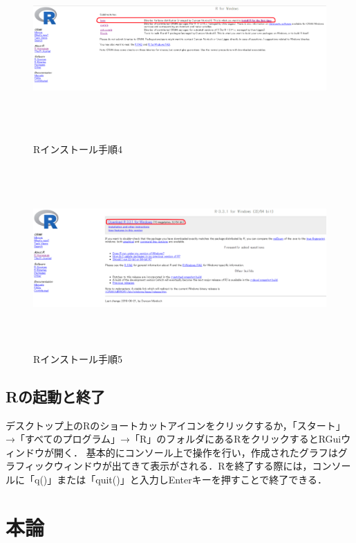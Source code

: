 \begin{figure}[p]
\centering
\includegraphics[height=7cm,width=13cm]{R25.pdf}
\caption{Rインストール手順4}\label{サンプル図}
\end{figure}



\begin{figure}[p]
\centering
\includegraphics[height=7cm,width=13cm]{R3.pdf}
\caption{Rインストール手順5}\label{サンプル図}
\end{figure}


\newpage

\section{Rの起動と終了}
デスクトップ上のRのショートカットアイコンをクリックするか，「スタート」→「すべてのプログラム」→「R」のフォルダにあるRをクリックするとRGuiウィンドウが開く．
基本的にコンソール上で操作を行い，作成されたグラフはグラフィックウィンドウが出てきて表示がされる．Rを終了する際には，コンソールに「q()」または「quit()」と入力しEnterキーを押すことで終了できる．


\chapter{本論}


